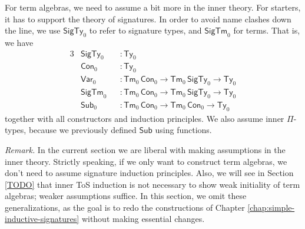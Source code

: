 \documentclass[12pt,a4paper,twoside,openany]{book}
\theoremstyle{remark}
\theoremstyle{definition}
\theoremstyle{theorem}
\newcommand{\ms}[1]{\mathsf{#1}}
\newcommand{\Con}{\mathsf{Con}}
\newcommand{\Sub}{\mathsf{Sub}}
\newcommand{\Tm}{\mathsf{Tm}}
\newcommand{\Ty}{\mathsf{Ty}}
\newcommand{\SigTy}{\mathsf{SigTy}}
\newcommand{\SigTm}{\mathsf{SigTm}}
\newcommand{\Var}{\ms{Var}}
\begin{document}
For term algebras, we need to assume a bit more in the inner theory. For
starters, it has to support the theory of signatures. In order to avoid name
clashes down the line, we use $\SigTy_0$ to refer to signature types, and
$\SigTm_0$ for terms. That is, we have
\begin{alignat*}{3}
  & \SigTy_0  &&: \Ty_0\\
  & \Con_0   &&: \Ty_0\\
  & \Var_0   &&: \Tm_0\,\Con_0 \to \Tm_0\,\SigTy_0 \to \Ty_0\\
  & \SigTm_0 &&: \Tm_0\,\Con_0 \to \Tm_0\,\SigTy_0 \to \Ty_0\\
  & \Sub_0   &&: \Tm_0\,\Con_0 \to \Tm_0\,\Con_0 \to \Ty_0
\end{alignat*}
together with all constructors and induction principles. We also assume inner
$\Pi$-types, because we previously defined $\Sub$ using functions.

\emph{Remark.} In the current section we are liberal with making assumptions in
the inner theory. Strictly speaking, if we only want to construct term algebras,
we don't need to assume signature induction principles. Also, we will see in
Section \ref{TODO} that inner ToS induction is not necessary to show weak
initiality of term algebras; weaker assumptions suffice. In this section, we
omit these generalizations, as the goal is to redo the constructions of Chapter
\ref{chap:simple-inductive-signatures} without making essential changes.
\end{document}
